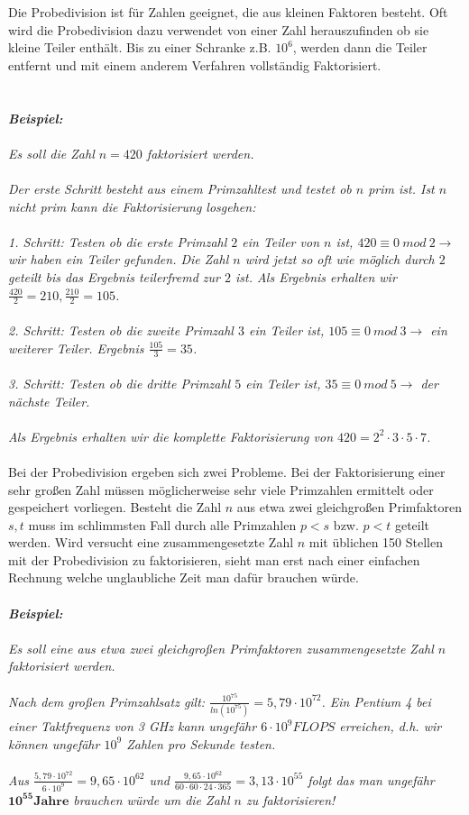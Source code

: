 \documentclass[a4paper,11pt]{article}
\begin{document}
Die Probedivision ist für Zahlen geeignet, die aus kleinen Faktoren
besteht. Oft wird die Probedivision dazu verwendet von einer Zahl
herauszufinden ob sie kleine Teiler enthält. Bis zu einer Schranke
z.B. $10^6$, werden dann die Teiler entfernt und mit einem anderem
Verfahren vollständig Faktorisiert.\\\\\\
{\it
\textbf{Beispiel:}\\\\
Es soll die Zahl $n=420$ faktorisiert werden.\\\\
Der erste Schritt besteht aus einem Primzahltest und
testet ob $n$ prim ist. Ist $n$ nicht prim kann die Faktorisierung losgehen:\\\\
1. Schritt: Testen ob die erste Primzahl $2$ ein Teiler von $n$ ist, $420\equiv0\ mod\ 2 \rightarrow$
wir haben ein Teiler gefunden. Die Zahl $n$ wird jetzt so oft wie möglich durch $2$
geteilt bis das Ergebnis teilerfremd zur $2$ ist. Als Ergebnis erhalten wir
$\frac{420}{2} = 210, \frac{210}{2} = 105$.\\\\
2. Schritt: Testen ob die zweite Primzahl $3$ ein Teiler ist, $105\equiv 0\ mod\ 3 \rightarrow$
ein weiterer Teiler. Ergebnis $\frac{105}{3} = 35$.\\\\
3. Schritt: Testen ob die dritte Primzahl $5$ ein Teiler ist, $35\equiv 0\ mod\ 5 \rightarrow$ der
nächste Teiler.\\\\
Als Ergebnis erhalten wir die komplette Faktorisierung von $420 = 2^2\cdot3\cdot5\cdot7$.\\\\
}
Bei der Probedivision ergeben sich zwei Probleme. Bei der Faktorisierung einer
sehr großen Zahl müssen möglicherweise sehr viele Primzahlen ermittelt oder
gespeichert vorliegen. Besteht die Zahl $n$ aus etwa zwei gleichgroßen Primfaktoren
$s,t$ muss im schlimmsten Fall durch alle Primzahlen $p<s$ bzw. $p<t$ geteilt werden.
Wird versucht eine zusammengesetzte Zahl $n$ mit üblichen 150 Stellen mit der
Probedivision zu faktorisieren, sieht man erst nach einer einfachen Rechnung
welche unglaubliche Zeit man dafür brauchen würde.\\\\
{\it
\textbf{Beispiel:}\\\\
Es soll eine aus etwa zwei gleichgroßen Primfaktoren zusammengesetzte Zahl $n$
faktorisiert werden.\\\\
Nach dem großen Primzahlsatz gilt: $\frac{10^{75}}{ln(10^{75})} = 5,79\cdot10^{72}$.
Ein Pentium 4 bei einer Taktfrequenz von 3 GHz kann ungefähr $6\cdot10^9 FLOPS$
erreichen, d.h. wir können ungefähr $10^9$ Zahlen pro Sekunde testen.\\\\
Aus $\frac{5,79\cdot10^{72}}{6\cdot10^9} = 9,65\cdot10^{62}$ und
$\frac{9,65\cdot10^{62}}{60\cdot60\cdot24\cdot365} = 3,13\cdot10^{55}$ folgt das
man ungefähr $\mathbf{10^{55} Jahre}$ brauchen würde um die Zahl $n$ zu faktorisieren!
}
\end{document}
